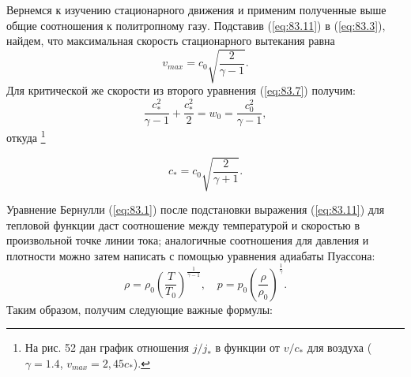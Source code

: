 Вернемся к изучению стационарного движения и применим полученные выше общие соотношения к политропному газу. Подставив (\ref{eq:83.11}) в (\ref{eq:83.3}), найдем, что максимальная скорость стационарного вытекания равна
\begin{equation}
    \label{eq:83.13}
    v_{max} = c_0 \sqrt{\frac{2}{\gamma - 1}}.
\end{equation}
Для критической же скорости из второго уравнения (\ref{eq:83.7}) получим:
\[
    \frac{c^2_*}{\gamma - 1} + \frac{c^2_*}{2} = w_0 = \frac{c^2_0}{\gamma - 1},
\]
откуда \footnote{
На рис. 52 дан график отношения $j/j_*$ в функции от $v/c_*$ для воздуха ($\gamma =1.4$, $v_{max} = 2,45c_*$).}

\begin{equation}
    \label{eq:83.14}
    c_* = c_0 \sqrt{\frac{2}{\gamma+1}}.
\end{equation}

Уравнение Бернулли (\ref{eq:83.1}) после подстановки выражения (\ref{eq:83.11}) для тепловой функции даст соотношение между температурой и скоростью в произвольной точке линии тока; аналогичные соотношения для давления и плотности можно затем написать с помощью уравнения адиабаты Пуассона:
\begin{equation}
    \label{eq:83.15}
    \rho=\rho_0 \left(\frac{T}{T_0}\right)^{\frac1{\gamma - 1}}, \quad
    p =p_0 \left(\frac{\rho}{\rho_0}\right)^{\frac1{\gamma}}.
\end{equation}
Таким образом, получим следующие важные формулы:

